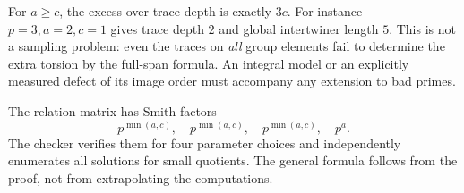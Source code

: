 For \(a\geq c\), the excess over trace depth is exactly \(3c\).
For instance \(p=3,a=2,c=1\) gives trace depth \(2\) and global
intertwiner length \(5\). This is not a sampling problem: even the
traces on \emph{all} group elements fail to determine the extra torsion
by the full-span formula. An integral model or an explicitly measured
defect of its image order must accompany any extension to bad primes.

The relation matrix has Smith factors
\[
 p^{\min(a,c)},\quad p^{\min(a,c)},\quad
 p^{\min(a,c)},\quad p^a .
\]
The checker verifies them for four parameter choices and independently
enumerates all solutions for small quotients. The general formula
follows from the proof, not from extrapolating the computations.

